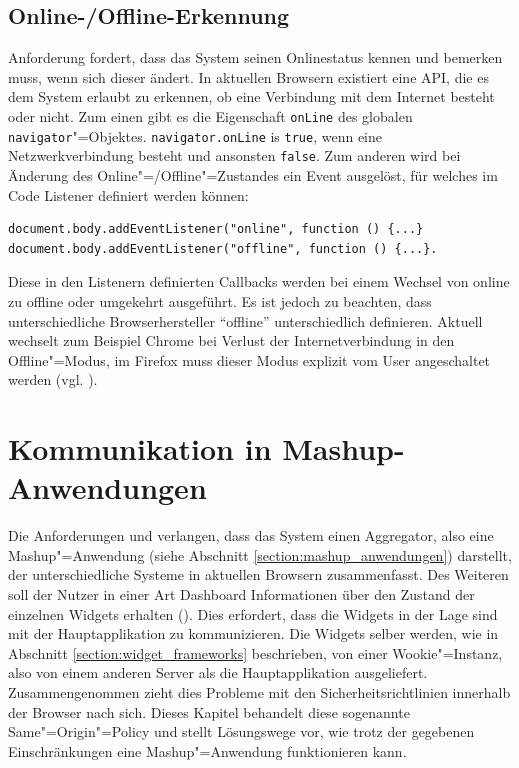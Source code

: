 \subsection{Online-/Offline-Erkennung}\label{section:online_offline_erkennung}
Anforderung  fordert, dass das System seinen Onlinestatus kennen und bemerken muss, wenn sich dieser ändert. In aktuellen Browsern existiert eine API, die es dem System erlaubt zu erkennen, ob eine Verbindung mit dem Internet besteht oder nicht. Zum einen gibt es die Eigenschaft \texttt{onLine} des globalen \texttt{navigator}"=Objektes. \texttt{navigator.onLine} is \texttt{true}, wenn eine Netzwerkverbindung besteht und ansonsten \texttt{false}. Zum anderen wird bei Änderung des Online"=/Offline"=Zustandes ein Event ausgelöst, für welches im Code Listener definiert werden können:
\begin{lstlisting}
document.body.addEventListener("online", function () {...} 
document.body.addEventListener("offline", function () {...}.
\end{lstlisting}          
Diese in den Listenern definierten Callbacks werden bei einem Wechsel von online zu offline oder umgekehrt ausgeführt. Es ist jedoch zu beachten, dass unterschiedliche Browserhersteller "`offline"' unterschiedlich definieren. Aktuell wechselt zum Beispiel Chrome bei Verlust der Internetverbindung in den Offline"=Modus, im Firefox muss dieser Modus explizit vom User angeschaltet werden (vgl. \cite{MozBug2011}).

\section{Kommunikation in Mashup-Anwendungen}\label{section:kommunikation_in_mashup_anwendungen}
Die Anforderungen  und  verlangen, dass das System einen Aggregator, also eine Mashup"=Anwendung (siehe Abschnitt \ref{section:mashup_anwendungen}) darstellt, der unterschiedliche Systeme in aktuellen Browsern zusammenfasst. Des Weiteren soll der Nutzer in einer Art Dashboard Informationen über den Zustand der einzelnen Widgets erhalten (). Dies erfordert, dass die Widgets in der Lage sind mit der Hauptapplikation zu kommunizieren. Die Widgets selber werden, wie in Abschnitt \ref{section:widget_frameworks} beschrieben, von einer Wookie"=Instanz, also von einem anderen Server als die Hauptapplikation ausgeliefert. Zusammengenommen zieht dies Probleme mit den Sicherheitsrichtlinien innerhalb der Browser nach sich. Dieses Kapitel behandelt diese sogenannte Same"=Origin"=Policy und stellt Lösungswege vor, wie trotz der gegebenen Einschränkungen eine Mashup"=Anwendung funktionieren kann.

